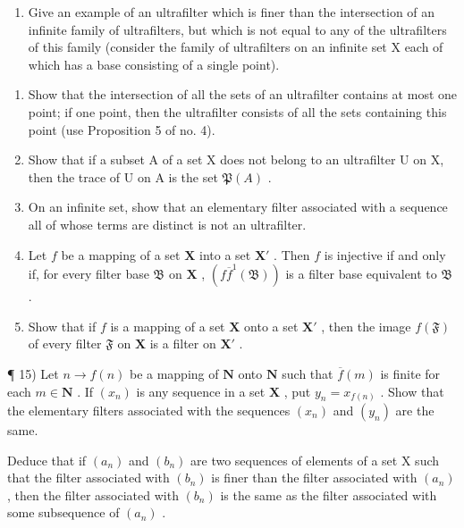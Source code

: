 \begin{enumerate}
\def\labelenumi{\alph{enumi})}
\setcounter{enumi}{1}
\tightlist
\item
  Give an example of an ultrafilter which is finer than the intersection of an infinite family of ultrafilters, but which is not equal to any of the ultrafilters of this family (consider the family of ultrafilters on an infinite set X each of which has a base consisting of a single point).
\end{enumerate}

\begin{enumerate}
\def\labelenumi{\arabic{enumi})}
\setcounter{enumi}{9}
\item
  Show that the intersection of all the sets of an ultrafilter contains at most one point; if one point, then the ultrafilter consists of all the sets containing this point (use Proposition 5 of no. 4).
\item
  Show that if a subset A of a set X does not belong to an ultrafilter U on X, then the trace of U on A is the set \(\mathfrak{P}(A)\) .
\item
  On an infinite set, show that an elementary filter associated with a sequence all of whose terms are distinct is not an ultrafilter.
\item
  Let \(f\) be a mapping of a set \(\mathbf{X}\) into a set \(\mathbf{X}'\) . Then \(f\) is injective if and only if, for every filter base \(\mathfrak{B}\) on \(\mathbf{X}\) , \((f\overline{f}^{1}(\mathfrak{B}))\) is a filter base equivalent to \(\mathfrak{B}\) .
\item
  Show that if \(f\) is a mapping of a set \(\mathbf{X}\) onto a set \(\mathbf{X}'\) , then the image \(f(\mathfrak{F})\) of every filter \(\mathfrak{F}\) on \(\mathbf{X}\) is a filter on \(\mathbf{X}'\) .
\end{enumerate}

¶ 15) Let \(n \to f(n)\) be a mapping of \(\mathbf{N}\) onto \(\mathbf{N}\) such that \(\overline{f}(m)\) is finite for each \(m \in \mathbf{N}\) . If \((x_n)\) is any sequence in a set \(\mathbf{X}\) , put \(y_n = x_{f(n)}\) . Show that the elementary filters associated with the sequences \((x_n)\) and \((y_n)\) are the same.

Deduce that if \((a_{n})\) and \((b_{n})\) are two sequences of elements of a set X such that the filter associated with \((b_{n})\) is finer than the filter associated with \((a_{n})\) , then the filter associated with \((b_{n})\) is the same as the filter associated with some subsequence of \((a_{n})\) .

